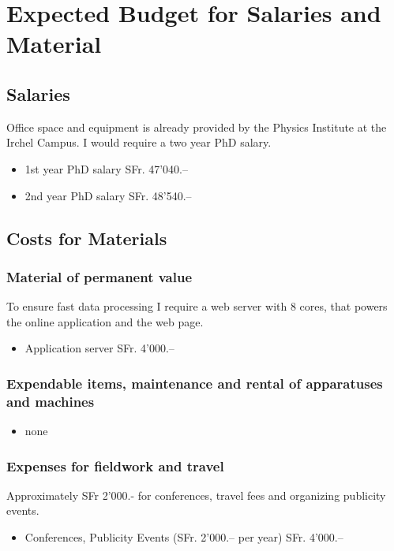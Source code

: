 \documentclass[12pt]{article}
\begin{document}
\pagestyle{empty}

\newpage

\section*{Expected Budget for Salaries and Material}

\subsection{Salaries}
Office space and equipment is already provided by the Physics Institute at the Irchel Campus.
I would require a two year PhD salary.

\begin{itemize}
	\item 1st year PhD salary \hfill SFr. 47'040.--
	\item 2nd year PhD salary \hfill SFr. 48'540.--
\end{itemize}


\subsection{Costs for Materials}

\subsubsection{Material of permanent value}
To ensure fast data processing I require a web server with 8 cores, that powers the online application and the web page.
\begin{itemize}
	\item Application server \hfill SFr. 4'000.--
\end{itemize}

\subsubsection{Expendable items, maintenance and rental of apparatuses and machines}
\begin{itemize}
	\item none
\end{itemize}


\subsubsection{Expenses for fieldwork and travel}
Approximately SFr 2'000.- for conferences, travel fees and organizing publicity events.
\begin{itemize}
	\item Conferences, Publicity Events (SFr. 2'000.-- per year) \hfill SFr. 4'000.--
\end{itemize}
\end{document}
